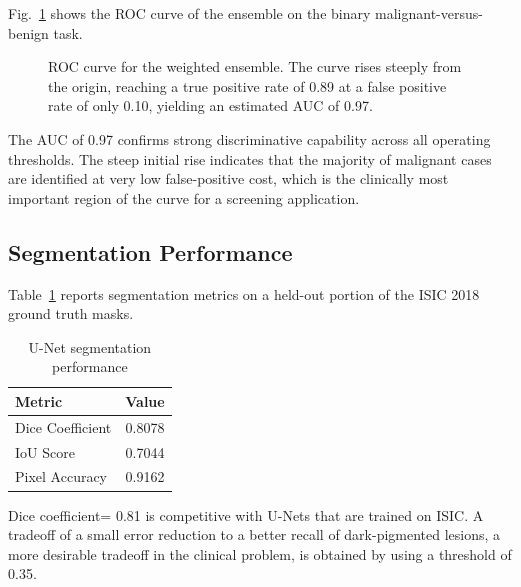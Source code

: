 \documentclass[conference]{IEEEtran}
\begin{document}
Fig.~\ref{fig:roc_curve} shows the ROC curve of the ensemble on the binary malignant-versus-benign task.

\begin{figure}[htbp]
\centering
{}
\caption{ROC curve for the weighted ensemble. The curve rises steeply from the origin, reaching a true positive rate of 0.89 at a false positive rate of only 0.10, yielding an estimated AUC of 0.97.}
\label{fig:roc_curve}
\end{figure}

\FloatBarrier

The AUC of 0.97 confirms strong discriminative capability across all operating thresholds. The steep initial rise indicates that the majority of malignant cases are identified at very low false-positive cost, which is the clinically most important region of the curve for a screening application.

\subsection{Segmentation Performance}

Table~\ref{tab:segmentation_results} reports segmentation metrics on a held-out portion of the ISIC 2018 ground truth masks.

\begin{table}[htbp]
\centering
\caption{U-Net segmentation performance}
\label{tab:segmentation_results}
\begin{tabular}{lc}
\toprule
Metric & Value \\
\midrule
Dice Coefficient & 0.8078 \\
IoU Score & 0.7044 \\
Pixel Accuracy & 0.9162 \\
\bottomrule
\end{tabular}
\end{table}

Dice coefficient= 0.81 is competitive with U-Nets that are trained on ISIC. A tradeoff of a small error reduction to a better recall of dark-pigmented lesions, a more desirable tradeoff in the clinical problem, is obtained by using a threshold of 0.35.
\end{document}
